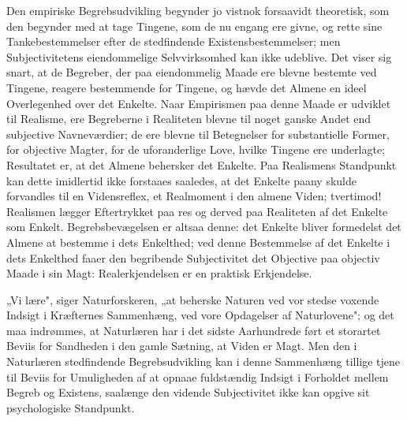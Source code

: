 \documentclass[12pt]{book}
\newcommand{\opage}[1]{\marginnote{\footnotesize\textit{[#1]}}}
\begin{document}
Den empiriske Begrebsudvikling begynder jo vistnok forsaavidt theoretisk, som den begynder med at
tage Tingene, som de nu engang ere givne, og rette sine Tankebestemmelser efter de stedfindende
Existensbestemmelser; men Subjectivitetens eiendommelige Selvvirksomhed kan ikke udeblive. Det
viser sig snart, at de Begreber, der paa eiendommelig Maade ere blevne bestemte ved Tingene,
reagere bestemmende for Tingene, og hævde det Almene en ideel Overlegenhed over det Enkelte. Naar
Empirismen paa denne Maade er udviklet til Realisme, ere Begreberne i Realiteten blevne til noget
ganske Andet end subjective Navneværdier; de ere blevne til Betegnelser for substantielle Former,
for objective Magter, for de uforanderlige Love, hvilke Tingene ere underlagte; Resultatet er, at
det Almene behersker det Enkelte. Paa Realismens Standpunkt kan dette imidlertid ikke forstaaes
saaledes, at det Enkelte paany skulde forvandles til en Vidensreflex, et Realmoment i den almene
Viden; tvertimod! Realismen lægger Eftertrykket paa res og derved paa Realiteten af det Enkelte som
Enkelt. Begrebsbevægelsen er altsaa denne: det Enkelte bliver formedelst det Almene at bestemme i
dets Enkelthed; ved denne Bestemmelse af det Enkelte i dets Enkelthed faaer den begribende
\opage{196} Subjectivitet det Objective paa objectiv Maade i sin Magt: Realerkjendelsen er en praktisk
Erkjendelse.

„Vi lære", siger Naturforskeren, „at beherske Naturen ved vor stedse voxende Indsigt i Kræfternes
Sammenhæng, ved vore Opdagelser af Naturlovene"; og det maa indrømmes, at Naturlæren har i det
sidste Aarhundrede ført et storartet Beviis for Sandheden i den gamle Sætning, at Viden er Magt.
Men den i Naturlæren stedfindende Begrebsudvikling kan i denne Sammenhæng tillige tjene til Beviis
for Umuligheden af at opnaae fuldstændig Indsigt i Forholdet mellem Begreb og Existens, saalænge
den vidende Subjectivitet ikke kan opgive sit psychologiske Standpunkt.
\end{document}
